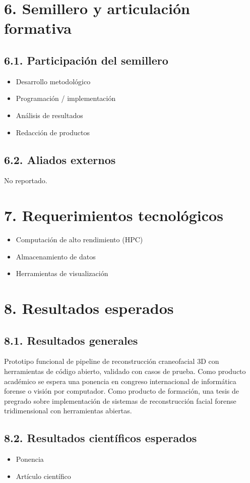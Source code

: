 \documentclass[a4paper,12pt]{article}
\begin{document}
\section*{6. Semillero y articulación formativa}
\subsection*{6.1. Participación del semillero}
\begin{itemize}
    \item Desarrollo metodológico
    \item Programación / implementación
    \item Análisis de resultados
    \item Redacción de productos
\end{itemize}

\subsection*{6.2. Aliados externos}
No reportado.

\section*{7. Requerimientos tecnológicos}
\begin{itemize}
    \item Computación de alto rendimiento (HPC)
    \item Almacenamiento de datos
    \item Herramientas de visualización
\end{itemize}

\section*{8. Resultados esperados}
\subsection*{8.1. Resultados generales}
Prototipo funcional de pipeline de reconstrucción craneofacial 3D con herramientas de código abierto, validado con casos de prueba. Como producto académico se espera una ponencia en congreso internacional de informática forense o visión por computador. Como producto de formación, una tesis de pregrado sobre implementación de sistemas de reconstrucción facial forense tridimensional con herramientas abiertas.

\subsection*{8.2. Resultados científicos esperados}
\begin{itemize}
    \item Ponencia
    \item Artículo científico
\end{itemize}
\end{document}
